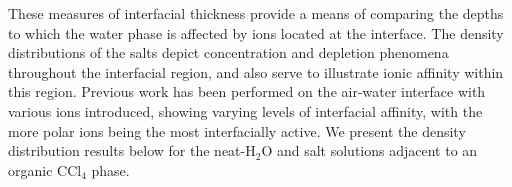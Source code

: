 These measures of interfacial thickness provide a means of comparing the depths to which the water phase is affected by ions located at the interface. The density distributions of the salts depict concentration and depletion phenomena throughout the interfacial region, and also serve to illustrate ionic affinity within this region. Previous work has been performed on the air-water interface with various ions introduced, showing varying levels of interfacial affinity, with the more polar ions being the most interfacially active.\cite{Luo2006,Petersen2006,Petersen2005a,Allen2009,Hofft2006,Beattie2005,Bian2009,Dang2004b} We present the density distribution results below for the neat-H$_2$O and salt solutions adjacent to an organic CCl$_4$ phase. %




